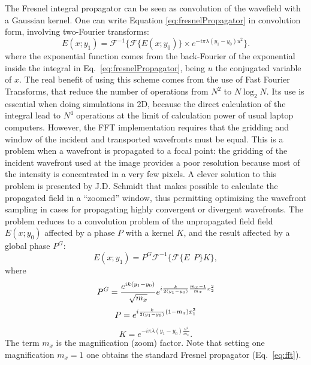\documentclass{iucr}              %
\begin{document}
The Fresnel integral propagator can be seen as convolution of the wavefield with a Gaussian kernel. 
One can write Equation \ref{eq:fresnelPropagator} in convolution form, involving two-Fourier transforms:
\begin{equation}\label{eq:fft}
E(x; y_1) = \mathcal{F}^{-1}\Big\{ \mathcal{F}\{E(x; y_0)\} \times e^{-i \pi \lambda (y_1-y_0) u^2} \Big\}.
\end{equation} 
where the exponential function comes from the back-Fourier of the exponential inside the integral in Eq.~\ref{eq:fresnelPropagator}, being $u$ the conjugated variable of $x$. 
The real benefit of using this scheme comes from the use of Fast Fourier Transforms, that reduce the number of operations from $N^2$ to $N \log_2 N$. Its use is essential when doing simulations in 2D, because the direct calculation of the integral lead to $N^4$ operations at the limit of calculation power of usual laptop computers. However, the FFT implementation requires that the gridding and window of the incident and transported wavefronts must be equal. This is a problem when a wavefront is propagated to a focal point: the gridding of the incident wavefront used at the image provides a poor resolution because most of the intensity is concentrated in a very few pixels. A clever solution to this problem is presented by J.D. Schmidt \cite{schmidt} that makes possible to calculate the propagated field in a ``zoomed'' window, thus permitting optimizing the wavefront sampling in cases for propagating highly convergent or divergent wavefronts. The problem reduces to a convolution problem of the unpropagated field field $E(x;y_0)$ affected by a phase $P$ with a kernel $K$, and the result affected by a global phase $P^G$: 
\begin{equation}
E(x; y_1) = P^G \mathcal{F}^{-1} \Big\{ \mathcal{F} \big\{ E~~P \big\} K \Big\},
\end{equation}
where
\begin{equation}
P^G =  \frac { e^{ik(y_1-y_0) }}{\sqrt{m_x} }e^{i \frac{k}{2 (y_1-y_0)} \frac{m_x - 1}{m_x}x_2^2}  \\
\end{equation}
\begin{equation}
P = e^{i \frac{k}{2(y_1-y_0)} (1-m_x)x_1^2 } \\
\end{equation}
\begin{equation}
K = e^{-i \pi \lambda (y_1-y_0) \frac{u^2}{m_x} }.
\end{equation}
The term $m_x$ is the magnification (zoom) factor. 
Note that setting one magnification $m_x=1$ one obtains the standard Fresnel propagator (Eq.~\ref{eq:fft}).
\end{document}
